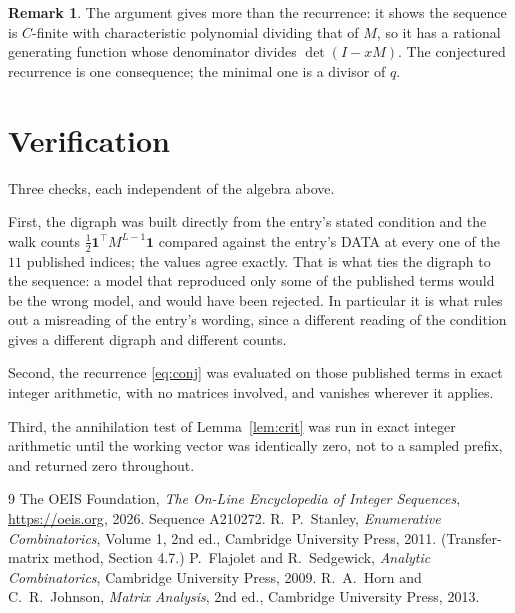 \documentclass[11pt,a4paper]{article}
\theoremstyle{plain}
\theoremstyle{definition}
\newtheorem{remark}[theorem]{Remark}
\begin{document}
\begin{remark}
The argument gives more than the recurrence: it shows the sequence is $C$-finite with
characteristic polynomial dividing that of $M$, so it has a rational generating function
whose denominator divides $\det(I-xM)$. The conjectured recurrence is one consequence; the
minimal one is a divisor of $q$.
\end{remark}

\section{Verification}

Three checks, each independent of the algebra above.

First, the digraph was built directly from the entry's stated condition and the walk counts
$\tfrac1{2}\mathbf{1}^{\!\top}M^{L-1}\mathbf{1}$ compared against the entry's DATA at
every one of the $11$ published indices; the values agree exactly. That is what ties
the digraph to the sequence: a model that reproduced only some of the published terms would
be the wrong model, and would have been rejected. In particular it is what rules out a
misreading of the entry's wording, since a different reading of the condition gives a
different digraph and different counts.

Second, the recurrence \eqref{eq:conj} was evaluated on those published terms in exact
integer arithmetic, with no matrices involved, and vanishes wherever it applies.

Third, the annihilation test of Lemma~\ref{lem:crit} was run in exact integer arithmetic
until the working vector was identically zero, not to a sampled prefix, and returned zero
throughout.

\begin{thebibliography}{9}
 The OEIS Foundation, \emph{The On-Line Encyclopedia of Integer
Sequences}, \url{https://oeis.org}, 2026. Sequence A210272.
 R.~P.~Stanley, \emph{Enumerative Combinatorics}, Volume 1, 2nd ed.,
Cambridge University Press, 2011. (Transfer-matrix method, Section 4.7.)
 P.~Flajolet and R.~Sedgewick, \emph{Analytic Combinatorics}, Cambridge
University Press, 2009.
 R.~A.~Horn and C.~R.~Johnson, \emph{Matrix Analysis}, 2nd ed., Cambridge
University Press, 2013.
\end{thebibliography}
\end{document}
